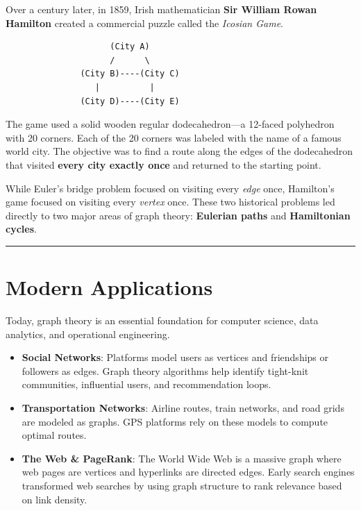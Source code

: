 \documentclass[
]{book}
\theoremstyle{definition}
\theoremstyle{definition}
\theoremstyle{definition}
\theoremstyle{definition}
\theoremstyle{remark}
\begin{document}
Over a century later, in 1859, Irish mathematician \textbf{Sir William Rowan Hamilton} created a commercial puzzle called the \emph{Icosian Game}.

\begin{verbatim}
                     (City A)
                     /      \
               (City B)----(City C)
                  |          |
               (City D)----(City E)
\end{verbatim}

The game used a solid wooden regular dodecahedron---a 12-faced polyhedron with 20 corners. Each of the 20 corners was labeled with the name of a famous world city. The objective was to find a route along the edges of the dodecahedron that visited \textbf{every city exactly once} and returned to the starting point.

While Euler's bridge problem focused on visiting every \emph{edge} once, Hamilton's game focused on visiting every \emph{vertex} once. These two historical problems led directly to two major areas of graph theory: \textbf{Eulerian paths} and \textbf{Hamiltonian cycles}.

\begin{center}\rule{0.5\linewidth}{0.5pt}\end{center}

\section{Modern Applications}\label{modern-applications}

Today, graph theory is an essential foundation for computer science, data analytics, and operational engineering.

\begin{itemize}
\item
  \textbf{Social Networks}: Platforms model users as vertices and friendships or followers as edges. Graph theory algorithms help identify tight-knit communities, influential users, and recommendation loops.
\item
  \textbf{Transportation Networks}: Airline routes, train networks, and road grids are modeled as graphs. GPS platforms rely on these models to compute optimal routes.
\item
  \textbf{The Web \& PageRank}: The World Wide Web is a massive graph where web pages are vertices and hyperlinks are directed edges. Early search engines transformed web searches by using graph structure to rank relevance based on link density.
\end{itemize}
\end{document}
